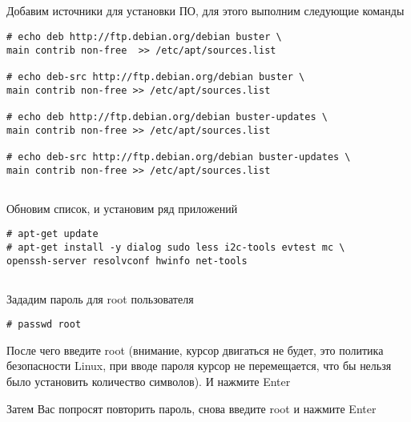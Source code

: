 \subsection{}Добавим источники для установки ПО, для этого выполним следующие команды 
\begin{lstlisting}
# echo deb http://ftp.debian.org/debian buster \
main contrib non-free  >> /etc/apt/sources.list

# echo deb-src http://ftp.debian.org/debian buster \
main contrib non-free >> /etc/apt/sources.list

# echo deb http://ftp.debian.org/debian buster-updates \
main contrib non-free >> /etc/apt/sources.list

# echo deb-src http://ftp.debian.org/debian buster-updates \
main contrib non-free >> /etc/apt/sources.list
\end{lstlisting}

\subsection{} Обновим список, и установим ряд приложений
\begin{lstlisting}
# apt-get update
# apt-get install -y dialog sudo less i2c-tools evtest mc \
openssh-server resolvconf hwinfo net-tools
\end{lstlisting}

\subsection{}Зададим пароль для root пользователя
\begin{lstlisting}
# passwd root
\end{lstlisting}
После чего введите root (внимание, курсор двигаться не будет, это политика безопасности Linux, при вводе пароля курсор не перемещается, что бы нельзя было установить количество символов). И нажмите Enter

Затем Вас попросят повторить пароль, снова введите root и нажмите Enter